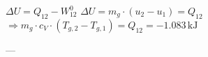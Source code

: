 \( \Delta U = Q_{12} - W_{12}^{0} \)  
\( \Delta U = m_g \cdot (u_2 - u_1) = Q_{12} \)  
\( \Rightarrow m_g \cdot c_V \cdot (T_{g,2} - T_{g,1}) = Q_{12} = -1.083 \, \text{kJ} \)  

---